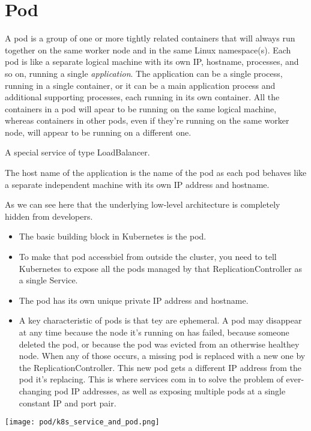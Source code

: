 \chapter{Pod}


A pod is a group of one or more tightly related containers that will always run together on the same worker node and in the same Linux namespace(s). Each pod is like a separate logical machine with its own IP, hostname, processes, and so on, running a single \emph{application}. The application can be a single process, running in a single container, or it can be a main application process and additional supporting processes, each running in its own container. All the containers in a pod will apear to be running on the same logical machine, whereas containers in other pods, even if they're running on the same worker node, will appear to be running on a different one.

A special service of type LoadBalancer.


The host name of the application is the name of the pod as each pod behaves like a separate independent machine with its own IP address and hostname.

\begin{remark}
	As we can see here that the underlying low-level architecture is completely hidden from developers.
\end{remark}

\begin{itemize}
	\item The basic building block in Kubernetes is the pod.
	\item To make that pod accessbiel from outside the cluster, you need to tell Kubernetes to expose all the pods managed by that ReplicationController as a single Service.
	\item The pod has its own unique private IP address and hostname.
	\item A key characteristic of pods is that tey are ephemeral. A pod may disappear at any time \textemdash because the node it's running on has failed, because someone deleted the pod, or because the pod was evicted from an otherwise healthey node. When any of those occurs, a missing pod is replaced with a new one by the ReplicationController. This new pod gets a different IP address from the pod it's replacing. This is where services com in \textemdash to solve the problem of ever-changing pod IP addresses, as well as exposing multiple pods at a single constant IP and port pair.
\end{itemize}



\begin{center}
	\texttt{[image: pod/k8s\_service\_and\_pod.png]}
\end{center}
